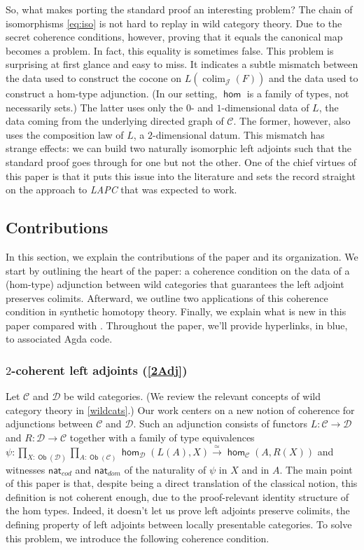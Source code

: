 \documentclass[10pt,a4paper]{article}
\theoremstyle{definition}
\theoremstyle{remark}
\newcommand{\C}{\mathcal C}
\newcommand{\D}{\mathcal D}
\newcommand{\dom}{\textit{dom}}
\newcommand{\cod}{\textit{cod}}
\newcommand{\nat}{\mathsf{nat}}
\newcommand{\J}{\mathcal{J}}
\newcommand{\0}{\mathbf{0}}
\newcommand{\1}{\mathbf{1}}
\newcommand{\2}{\mathbf{2}}
\DeclareMathOperator{\homm}{\mathsf{hom}}
\DeclareMathOperator{\colim}{\mathrm{colim}}
\DeclareMathOperator{\obb}{\mathsf{Ob}}
\begin{document}
So, what makes porting the standard proof an interesting problem? The chain of isomorphisms \eqref{eq:iso} is not hard to replay in wild category theory. Due to the secret coherence conditions, however, proving that it equals the canonical map becomes a problem. In fact, this equality is sometimes false. This problem is surprising at first glance and easy to miss. It indicates a subtle mismatch between the data used to construct the cocone on $L(\colim_{\J}(F))$ and the data used to construct a hom-type adjunction. (In our setting, $\homm$ is a family of types, not necessarily sets.) The latter uses only the $0$- and $1$-dimensional data of $L$, the data coming from the underlying directed graph of $\C$. The former, however, also uses the composition law of $L$, a $2$-dimensional datum. This mismatch has strange effects: we can build two naturally isomorphic left adjoints such that the standard proof goes through for one but not the other. One of the chief virtues of this paper is that it puts this issue into the literature and sets the record straight on the approach to \emph{LAPC} that was expected to work.

\subsection{Contributions}

In this section, we explain the contributions of the paper and its organization. We start by outlining the heart of the paper: a coherence condition on the data of a (hom-type) adjunction between wild categories that guarantees the left adjoint preserves colimits. Afterward, we outline two applications of this coherence condition in synthetic homotopy theory. Finally, we explain what is new in this paper compared with \cite{lapccsl}. Throughout the paper, we'll provide hyperlinks, in blue, to associated Agda code. 

\subsubsection{$2$-coherent left adjoints (\autoref{2Adj})}

Let $\C$ and $\D$ be wild categories. (We review the relevant concepts of wild category theory in \cref{wildcats}.) Our work centers on a new notion of coherence for adjunctions between $\C$ and $\D$.  Such an adjunction consists of functors $L : \C \to \D$ and $R : \D \to \C$ together with
a family of type equivalences $\psi : \prod_{X : \obb(\D)}\prod_{ A : \obb(\C)}\homm_{\D}(L(A), X) \xrightarrow{\simeq} \homm_{\C}(A,R(X))$ and witnesses $\nat_{\cod}$ and $\nat_{\dom}$ of the naturality of $\psi$ in $X$ and in $A$. The main point of this paper is that, despite being a direct translation of the classical notion, this definition is not coherent enough, due to the proof-relevant identity structure of the hom types. Indeed, it doesn't let us prove left adjoints preserve colimits, the defining property of left adjoints between locally presentable categories.
To solve this problem, we introduce the following coherence condition.
\end{document}
